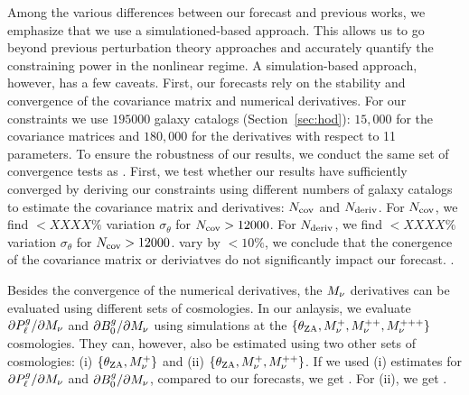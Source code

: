 
Among the various differences between our forecast and previous works, we
emphasize that we use a simulationed-based approach. This allows us to go beyond previous
perturbation theory approaches and accurately quantify the constraining power
in the nonlinear regime. A simulation-based approach, however, has a few caveats. 
First, our forecasts rely on the stability and convergence of the covariance 
matrix and numerical derivatives. 
For our constraints we use $195000$ galaxy catalogs (Section~\ref{sec:hod}): 
$15,000$ for the covariance matrices and $180,000$ for the derivatives with 
respect to 11 parameters. To ensure the robustness of our results, we conduct the
same set of convergence tests as \cite{hahn2020}. 
First, we test whether our results have sufficiently converged by deriving our 
constraints using different numbers of galaxy catalogs to estimate the covariance 
matrix and derivatives: $N_{\rm cov}$ and $N_{\rm deriv}$. For $N_{\rm cov}$,
we find $< XXXX\%$ variation $\sigma_\theta$ for $N_{\rm cov} > 12000$.
For $N_{\rm deriv}$, 
we find $< XXXX\%$ variation $\sigma_\theta$ for $N_{\rm cov} > 12000$.
vary by $< 10\%$, we conclude that the conergence of the covariance matrix or
deriviatves do not significantly impact our forecast. 
. 

Besides the convergence of the numerical derivatives, the $M_\nu$ derivatives
can be evaluated using different sets of cosmologies. In our anlaysis, we
evaluate ${\partial P^g_{\ell}}/{\partial M_\nu}$ and ${\partial B^g_0}/{\partial
M_\nu}$ using simulations at the $\{\theta_{\rm ZA}, M_\nu^+, M_\nu^{++},
M_\nu^{+++}\}$ cosmologies. They can, however, also be estimated using 
two other sets of cosmologies: (i) $\{\theta_{\rm ZA}, M_\nu^+\}$ and (ii)
$\{\theta_{\rm ZA}, M_\nu^+, M_\nu^{++}\}$. If we used (i) estimates for 
${\partial P^g_{\ell}}/{\partial M_\nu}$ and ${\partial B^g_0}/{\partial M_\nu}$, 
compared to our forecasts, we get . For (ii), we get . 

